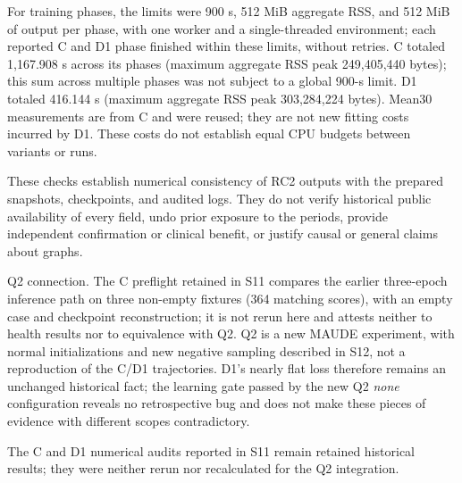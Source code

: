 For training phases, the limits were 900 s, 512 MiB aggregate RSS, and 512 MiB of output per phase, with one worker and a single-threaded environment; each reported C and D1 phase finished within these limits, without retries. C totaled 1,167.908 s across its phases (maximum aggregate RSS peak 249,405,440 bytes); this sum across multiple phases was not subject to a global 900-s limit. D1 totaled 416.144 s (maximum aggregate RSS peak 303,284,224 bytes). Mean30 measurements are from C and were reused; they are not new fitting costs incurred by D1. These costs do not establish equal CPU budgets between variants or runs.

These checks establish numerical consistency of RC2 outputs with the prepared snapshots, checkpoints, and audited logs. They do not verify historical public availability of every field, undo prior exposure to the periods, provide independent confirmation or clinical benefit, or justify causal or general claims about graphs.

Q2 connection. The C preflight retained in S11 compares the earlier three-epoch inference path on three non-empty fixtures (364 matching scores), with an empty case and checkpoint reconstruction; it is not rerun here and attests neither to health results nor to equivalence with Q2. Q2 is a new MAUDE experiment, with normal initializations and new negative sampling described in S12, not a reproduction of the C/D1 trajectories. D1's nearly flat loss therefore remains an unchanged historical fact; the learning gate passed by the new Q2 \emph{none} configuration reveals no retrospective bug and does not make these pieces of evidence with different scopes contradictory.

The C and D1 numerical audits reported in S11 remain retained historical results; they were neither rerun nor recalculated for the Q2 integration.